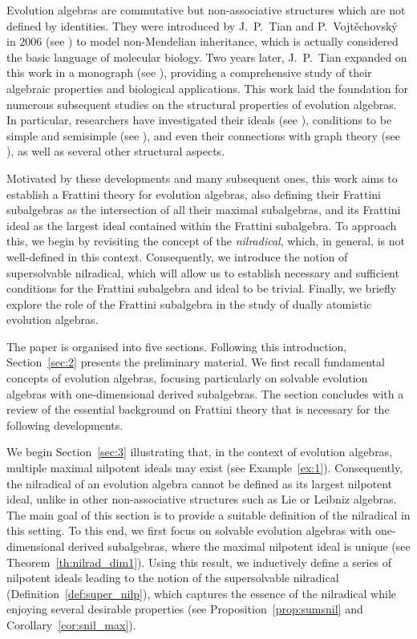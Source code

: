 \documentclass[12pt,reqno]{amsart}
\theoremstyle{definition}
\theoremstyle{remark}
\numberwithin{equation}{section}
\begin{document}
Evolution algebras are commutative but non-associative structures which are not defined by identities. They were introduced by J.~P.~Tian and P.~Vojt\v{e}chovsk\'{y} in $2006$ (see \cite{TV_06}) to model non-Mendelian inheritance, which is actually considered the basic language of molecular biology.
Two years later, J.~P.~Tian expanded on this work in a monograph (see \cite{Tian_08}), providing a comprehensive study of their algebraic properties and biological applications. 
This work laid the foundation for numerous subsequent studies on the structural properties of evolution algebras. In particular, researchers have investigated their ideals (see \cite{BCS_22_natural, CKS_19_basic}), conditions to be simple and semisimple (see \cite{CMMT_25}), and even their connections with graph theory (see \cite{EL_15}), as well as several other structural aspects.

Motivated by these developments and many subsequent ones, this work aims to establish a Frattini theory for evolution algebras, also defining their Frattini subalgebras as the intersection of all their maximal subalgebras, and its Frattini ideal as the largest ideal contained within the Frattini subalgebra. To approach this, we begin by revisiting the concept of the \textit{nilradical}, which, in general, is not well-defined in this context. Consequently, we introduce the notion of supersolvable nilradical, which will allow us to establish necessary and sufficient conditions for the Frattini subalgebra and ideal to be trivial. Finally, we briefly explore the role of the Frattini subalgebra in the study of dually atomistic evolution algebras.

The paper is organised into five sections. Following this introduction, Section~\ref{sec:2} presents the preliminary material. We first recall fundamental concepts of evolution algebras, focusing particularly on solvable evolution algebras with one-dimensional derived subalgebras. The section concludes with a review of the essential background on Frattini theory that is necessary for the following developments.

We begin Section~\ref{sec:3} illustrating that, in the context of evolution algebras, multiple maximal nilpotent ideals may exist (see Example~\ref{ex:1}). Consequently, the nilradical of an evolution algebra cannot be defined as its largest nilpotent ideal, unlike in other non-associative structures such as Lie or Leibniz algebras. The main goal of this section is to provide a suitable definition of the nilradical in this setting. To this end, we first focus on solvable evolution algebras with one-dimensional derived subalgebras, where the maximal nilpotent ideal is unique (see Theorem~\ref{th:nilrad_dim1}). Using this result, we inductively define a series of nilpotent ideals leading to the notion of the supersolvable nilradical (Definition~\ref{def:super_nilp}), which captures the essence of the nilradical while enjoying several desirable properties (see Proposition~\ref{prop:sumsnil} and Corollary~\ref{cor:snil_max}).
\end{document}

